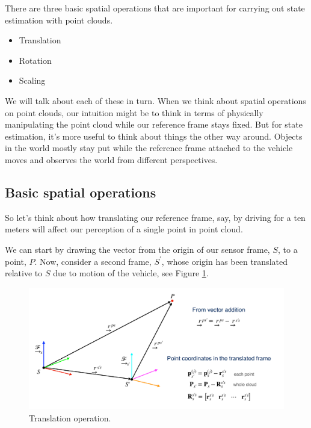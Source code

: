 There are three basic spatial
operations that are important for carrying out state estimation with point clouds. 

\begin{itemize}
\item Translation
\item Rotation
\item Scaling
\end{itemize}

We will talk about each of these in turn. When we think about spatial
operations on point clouds, our intuition might be to think in terms
of physically manipulating the point cloud while our reference frame stays fixed. But for state estimation, it's more useful to think about
things the other way around. Objects in the world mostly stay
put while the reference frame attached to the vehicle moves and observes
the world from different perspectives. 

\subsection{Basic spatial operations}

So let's think about how translating our
reference frame, say, by driving for a ten meters will affect our perception
of a single point in point cloud. 

We can start by drawing the vector from the origin of our sensor frame, $S$, to a point, $P$. Now, consider a second frame, $S^{'}$, whose origin has been translated relative
to $S$ due to motion of the vehicle, see Figure \ref{lidar_8}. 


\begin{figure}[!htb]
\begin{center}
\includegraphics[scale=0.280]{img/hardware/lidar_8.jpeg}
\end{center}
\caption{Translation operation.}
\label{lidar_8}
\end{figure}

